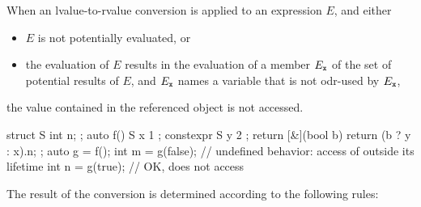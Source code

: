\pnum
When an lvalue-to-rvalue conversion
is applied to an expression $E$, and either
\begin{itemize}
\item $E$ is not potentially evaluated, or
\item the evaluation of $E$ results in the evaluation of a member
      $E_\tcode{x}$ of the set of potential results of $E$, and $E_\tcode{x}$
      names a variable  that is not odr-used by
      $E_\tcode{x}$,
\end{itemize}
the value contained in the referenced object is not accessed.
\begin{example}
\begin{codeblock}
struct S { int n; };
auto f() {
  S x { 1 };
  constexpr S y { 2 };
  return [&](bool b) { return (b ? y : x).n; };
}
auto g = f();
int m = g(false);   // undefined behavior: access of  outside its lifetime
int n = g(true);    // OK, does not access 
\end{codeblock}
\end{example}

\pnum
The result of the conversion is determined according to the
following rules:

